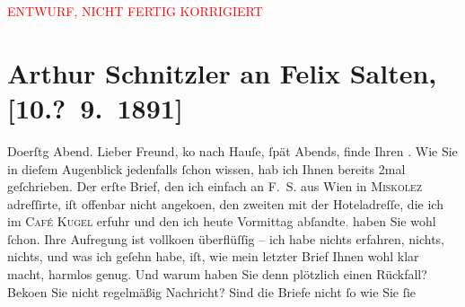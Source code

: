 
\begin{center}
            \textcolor{red}{ENTWURF, NICHT FERTIG KORRIGIERT}
                      \end{center}
            
         
         \renewcommand{\erwaehntePersonen}{Personen: Marie Glümer, Bertha Karlsburg, Felix Salten}
         \renewcommand{\erwaehnteOrte}{Orte: Café Kugel, Miskolc, Wien}
         \renewcommand{\erwaehnteWerke}{Werke: ?? [Drama über Offizier, der Partnerin eines Untergebenen verführt]}
               \section[Arthur Schnitzler an Felix Salten, {[}10.? 9. 1891{]}]{ Arthur Schnitzler an Felix Salten, {[}10.? 9. 1891{]}}\nopagebreak{}\rehead{ }\begin{ledgroupsized}[t]{13cm}\normalsize\beginnumbering \toendnotes[C]{\smallbreak\pagebreak[2]} 
\toendnotes[C]{\smallbreak}\pstart
           \raggedleft{}{\pb}Do{\geminationn}erſtg{ }Abend. \pend
           \pstart
           Lieber Freund, ko{\geminationm} nach
               Hauſe, ſpät Abends, finde Ihren \label{K_L02951-1v}\label{K_L02951-1h}. Wie Sie in dieſem Augenblick jedenfalls ſchon wissen, hab ich Ihnen bereits
               2mal geſchrieben. Der erſte {\pb}Brief, den ich
               einfach an \textsc{F. S.} aus Wien in \textsc{Miskolez} adreſſirte, iſt offenbar nicht angeko{\geminationm}en, den
               zweiten mit der Hoteladreſſe, die ich im \textsc{Café Kugel} erfuhr und den ich heute{ }Vormittag abſandte\textcolor{gray}{,} haben Sie wohl ſchon. Ihre
               Aufregung ist vollko{\geminationm}en {\pb}überflüſſig – ich habe nichts erfahren,
               nichts, nichts, und was ich geſehn habe, iſt, wie mein letzter Brief Ihnen wohl klar
               macht, harmlos genug. Und warum haben Sie denn plötzlich einen Rückfall? Beko{\geminationm}en­ Sie nicht regelmäßig Nachricht? {\pb}Sind die Briefe nicht ſo wie Sie ſie

\end{ledgroupsized}
